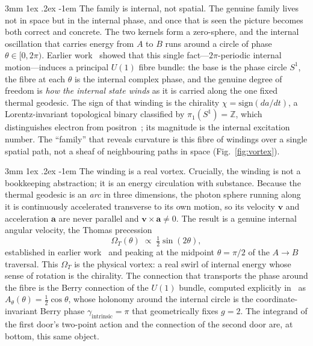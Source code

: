 \documentclass[%
 reprint, amsmath,amssymb, aps, prb, ]{revtex4-2}
\makeatletter
\numberwithin{equation}{section}
\renewcommand\paragraph{%
  \@startsection{paragraph}{4}{\z@}%
    {3mm \@plus 1ex \@minus .2ex}%
    {-1em}%
    {\normalfont\normalsize\itshape}}
\makeatother
\begin{document}
\paragraph{The family is internal, not spatial.}
The genuine family lives not in space but in the internal phase, and once that is seen the picture becomes both correct and concrete. The two kernels form a zero-sphere, and the internal oscillation that carries energy from $A$ to $B$ runs around a circle of phase $\theta\in[0,2\pi)$. Earlier work~\cite{hanamura48} showed that this single fact---$2\pi$-periodic internal motion---induces a principal $U(1)$ fibre bundle: the base is the phase circle $S^1$, the fibre at each $\theta$ is the internal complex phase, and the genuine degree of freedom is \emph{how the internal state winds} as it is carried along the one fixed thermal geodesic. The sign of that winding is the chirality $\chi=\mathrm{sign}(da/dt)$, a Lorentz-invariant topological binary classified by $\pi_1(S^1)=\mathbb{Z}$, which distinguishes electron from positron~\cite{hanamura50}; its magnitude is the internal excitation number. The ``family'' that reveals curvature is this fibre of windings over a single spatial path, not a sheaf of neighbouring paths in space (Fig.~\ref{fig:vortex}).

\paragraph{The winding is a real vortex.}
Crucially, the winding is not a bookkeeping abstraction; it is an energy circulation with substance. Because the thermal geodesic is an \emph{arc} in three dimensions, the photon sphere running along it is continuously accelerated transverse to its own motion, so its velocity $\mathbf v$ and acceleration $\mathbf a$ are never parallel and $\mathbf v\times\mathbf a\neq 0$. The result is a genuine internal angular velocity, the Thomas precession
\begin{equation}
\Omega_T(\theta)\;\propto\;\tfrac12\sin(2\theta),
\label{eq:omegaT}
\end{equation}
established in earlier work~\cite{hanamura19,hanamura49} and peaking at the midpoint $\theta=\pi/2$ of the $A\to B$ traversal. This $\Omega_T$ is the physical vortex: a real swirl of internal energy whose sense of rotation is the chirality. The connection that transports the phase around the fibre is the Berry connection of the $U(1)$ bundle, computed explicitly in~\cite{hanamura48} as $A_\theta(\theta)=\tfrac12\cos\theta$, whose holonomy around the internal circle is the coordinate-invariant Berry phase $\gamma_{\text{intrinsic}}=\pi$ that geometrically fixes $g=2$. The integrand of the first door's two-point action and the connection of the second door are, at bottom, this same object.
\end{document}
